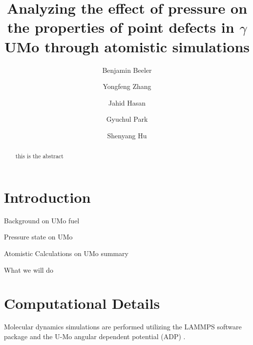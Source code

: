 \documentclass[11pt, oneside]{elsarticle}
\date{}							%
\begin{document}
\begin{frontmatter}

\title{Analyzing the effect of pressure on the properties of point defects in $\gamma$UMo through atomistic simulations}

\author[ncsu,inl]{Benjamin Beeler}
\author[wisc]{Yongfeng Zhang}
\author[ncsu]{Jahid Hasan}
\author[purdue]{Gyuchul Park}
\author[pnnl]{Shenyang Hu}
\address[ncsu]{North Carolina State University, Raleigh, NC 27695}
\address[inl]{Idaho National Laboratory, Idaho Falls, ID 83415}
\address[wisc]{University of Wisconsin-Madison, Madison, WI 53715}
\address[purdue]{Purdue University, XXXXX}
\address[pnnl]{Pacific Northwest National Laboratory, Idaho Falls, ID 83415}



\begin{abstract}
this is the abstract
\end{abstract}

\end{frontmatter}

\linenumbers
\modulolinenumbers[2]

\section{Introduction}

Background on UMo fuel

Pressure state on UMo

Atomistic Calculations on UMo summary

What we will do

\section{Computational Details}
Molecular dynamics simulations are performed utilizing the LAMMPS \cite{plimpton1995} software package and the U-Mo angular dependent potential (ADP) \cite{smirnovaADP}. 
\end{document}
